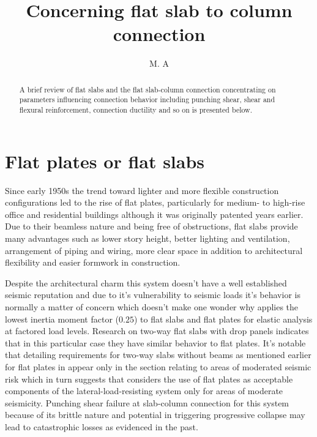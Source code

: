 \documentclass[twocolumn]{article} %
\title{Concerning flat slab to column connection}
\author{M. A}
\begin{document}
\maketitle
\begin{abstract}
A brief review of flat slabs and the flat slab-column connection concentrating on parameters influencing connection behavior including punching shear, shear and flexural reinforcement, connection ductility and so on is presented below.
\end{abstract}
\section{Flat plates or flat slabs }
Since early 1950s the trend toward lighter and more flexible construction configurations led to the rise of flat plates, particularly for medium- to high-rise office and residential buildings\citep{Fema2741997} although it was originally patented years earlier\citep{gasparini2002contributions,usp1909,usp1925}. Due to their beamless nature and being free of obstructions, flat slabs provide many advantages such as lower story height, better lighting and ventilation, arrangement of piping and wiring, more clear space in addition to architectural flexibility and easier formwork in construction. 

Despite the architectural charm this system doesn't have a well established seismic reputation and due to it's vulnerability to seismic loads it's behavior is normally a matter of concern\citep{HosahalliSomaprasadR1994SVoF,Derecho2001} which doesn't make one wonder why \cite{aci31819} applies the lowest inertia moment factor ($0.25$) to flat slabs and flat plates for elastic analysis at factored load levels. Research on two-way flat slabs with drop panels indicates that in this particular case they have similar behavior to flat plates\citep{odello1967behavior}. It's notable that detailing requirements for two-way slabs without beams as mentioned earlier for flat plates in \citet[Chapter 21]{aci31895} appear only in the section relating to areas of moderated seismic risk which in turn suggests that \cite{aci31895} considers the use of flat plates as acceptable components of the lateral-load-resisting system only for areas of moderate seismicity\citep{Derecho2001}. Punching shear failure at slab-column connection for this system because of its brittle nature and potential in triggering progressive collapse may lead to catastrophic losses as evidenced in the past\citep{king2004,PARK2012119}.
    
\end{document}
